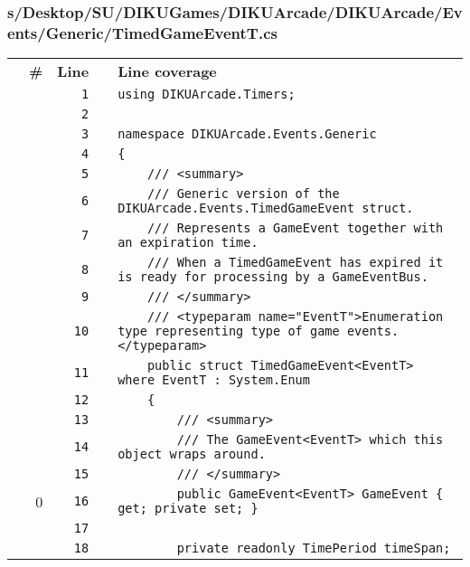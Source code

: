 \documentclass[a4paper,landscape,10pt]{article}
\begin{document}
\subsubsection{s/Desktop/SU/DIKUGames/DIKUArcade/DIKUArcade/Events/Generic/TimedGameEventT.cs}
\begin{longtable}[l]{lrrll}
\textbf{} & \textbf{\#} & \textbf{Line} & \textbf{} & \textbf{Line coverage}\\
\cellcolor{gray} &  & \verb~1~ & & \verb~using DIKUArcade.Timers;~\\
\cellcolor{gray} &  & \verb~2~ & & \verb~~\\
\cellcolor{gray} &  & \verb~3~ & & \verb~namespace DIKUArcade.Events.Generic~\\
\cellcolor{gray} &  & \verb~4~ & & \verb~{~\\
\cellcolor{gray} &  & \verb~5~ & & \verb~    /// <summary>~\\
\cellcolor{gray} &  & \verb~6~ & & \verb~    /// Generic version of the DIKUArcade.Events.TimedGameEvent struct.~\\
\cellcolor{gray} &  & \verb~7~ & & \verb~    /// Represents a GameEvent together with an expiration time.~\\
\cellcolor{gray} &  & \verb~8~ & & \verb~    /// When a TimedGameEvent has expired it is ready for processing by a GameEventBus.~\\
\cellcolor{gray} &  & \verb~9~ & & \verb~    /// </summary>~\\
\cellcolor{gray} &  & \verb~10~ & & \verb~    /// <typeparam name="EventT">Enumeration type representing type of game events.</typeparam>~\\
\cellcolor{gray} &  & \verb~11~ & & \verb~    public struct TimedGameEvent<EventT> where EventT : System.Enum~\\
\cellcolor{gray} &  & \verb~12~ & & \verb~    {~\\
\cellcolor{gray} &  & \verb~13~ & & \verb~        /// <summary>~\\
\cellcolor{gray} &  & \verb~14~ & & \verb~        /// The GameEvent<EventT> which this object wraps around.~\\
\cellcolor{gray} &  & \verb~15~ & & \verb~        /// </summary>~\\
\cellcolor{red} & 0 & \verb~16~ & & \verb~        public GameEvent<EventT> GameEvent { get; private set; }~\\
\cellcolor{gray} &  & \verb~17~ & & \verb~~\\
\cellcolor{gray} &  & \verb~18~ & & \verb~        private readonly TimePeriod timeSpan;~\\

\end{longtable}
\end{document}
